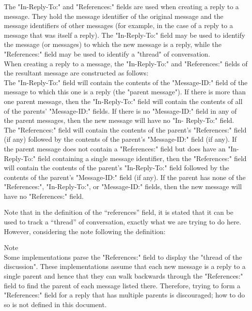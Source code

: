 \documentclass[a4paper,english]{report}
\begin{document}
\begin{displayquote}
The "In-Reply-To:" and "References:" fields are used when creating a
   reply to a message.  They hold the message identifier of the original
   message and the message identifiers of other messages (for example,
   in the case of a reply to a message that was itself a reply).  The
   "In-Reply-To:" field may be used to identify the message (or
   messages) to which the new message is a reply, while the
   "References:" field may be used to identify a "thread" of
   conversation.\\

   When creating a reply to a message, the "In-Reply-To:" and
   "References:" fields of the resultant message are constructed as
   follows:\\

   The "In-Reply-To:" field will contain the contents of the
   "Message-ID:" field of the message to which this one is a reply (the
   "parent message").  If there is more than one parent message, then
   the "In-Reply-To:" field will contain the contents of all of the
   parents' "Message-ID:" fields.  If there is no "Message-ID:" field in
   any of the parent messages, then the new message will have no "In-
   Reply-To:" field.\\

   The "References:" field will contain the contents of the parent's
   "References:" field (if any) followed by the contents of the parent's
   "Message-ID:" field (if any).  If the parent message does not contain
   a "References:" field but does have an "In-Reply-To:" field
   containing a single message identifier, then the "References:" field
   will contain the contents of the parent's "In-Reply-To:" field
   followed by the contents of the parent's "Message-ID:" field (if
   any).  If the parent has none of the "References:", "In-Reply-To:",
   or "Message-ID:" fields, then the new message will have no
   "References:" field.\\
\end{displayquote}

Note that in the definition of the “references” field, it is stated that it can be used to track a “thread” of conversation, exactly what we are trying to do here. However, considering the note following the definition:\\




\begin{displayquote}
	Note\\
	Some implementations parse the "References:" field to
      display the "thread of the discussion".  These implementations
      assume that each new message is a reply to a single parent and
      hence that they can walk backwards through the "References:" field
      to find the parent of each message listed there.  Therefore,
      trying to form a "References:" field for a reply that has multiple
      parents is discouraged; how to do so is not defined in this
      document.

\end{displayquote}
\end{document}
